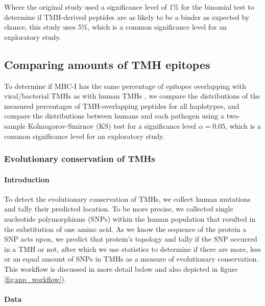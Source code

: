 Where the original study used a significance level of 1\% 
for the binomial test to determine if TMH-derived peptides 
are as likely to be a binder as expected by chance, this study
uses 5\%, which is a common significance level for an exploratory study.

\subsection{Comparing amounts of TMH epitopes}

To determine if MHC-I has the same percentage of epitopes overlapping
with viral/bacterial TMHs as with human TMHs , 
we compare the distributions of the measured percentages 
of TMH-overlapping peptides for all haplotypes,
and compare the distributions between humans and each pathogen
using a two-sample Kolmogorov-Smirnov (KS) test
for a significance level $\alpha = 0.05$, 
which is a common significance level for an exploratory study.

\subsubsection{Evolutionary conservation of TMHs}

\paragraph{Introduction}

To detect the evolutionary conservation of TMHs, 
we collect human mutations and 
tally their predicted location.
To be more precise, we collected single nucleotide
polymorphisms (SNPs) within the human population
that resulted in the substitution of one amino acid.
As we know the sequence of the protein a SNP acts upon,
we predict that protein's topology and tally if
the SNP occurred in a TMH or not, 
after which we use statistics to determine if there are
more, less or an equal amount of SNPs in TMHs
as a measure of evolutionary conservation.
This workflow is discussed in more detail below and also
depicted in figure \ref{fig:snp_workflow}).

\paragraph{Data}


